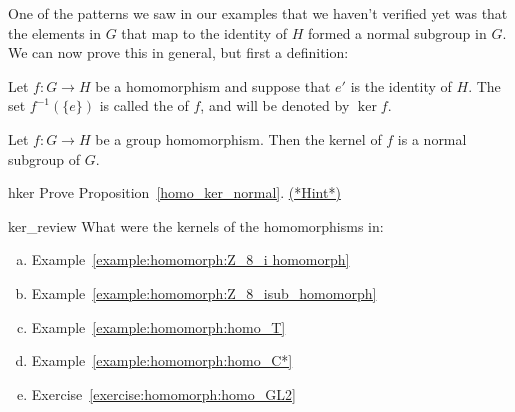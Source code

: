 \medskip

One of the patterns we saw in our examples that we haven't verified yet was that the elements in $G$ that map to the identity of $H$ formed a normal subgroup in $G$.  We can now prove this in general, but first a definition:
 
\begin{defn}\label{def:kernel} 
Let $f : G \rightarrow H$ be a  homomorphism and suppose that
$e'$ is the identity of $H$. 
The set  $f^{-1} ( \{ e \})$ is  called the  of $f$, and will
be denoted by $\ker f$\label{kernelofphi}. 
\end{defn}
 
 
\begin{thm}\label{homo_ker_normal}
Let $f : G \rightarrow H$ be a group homomorphism. Then the kernel
of $f$ is a normal subgroup of $G$. 
\end{thm}

\begin{exercise}{hker}
Prove Proposition~\ref{homo_ker_normal}. 
\hyperref[sec:homomorph:hints]{(*Hint*)} 
\end{exercise}

\begin{exercise}{ker_review}
What were the kernels of the homomorphisms in:
\begin{enumerate}[(a)]
\item
Example~\ref{example:homomorph:Z_8_i homomorph}
\item
Example~\ref{example:homomorph:Z_8_isub_homomorph}
\item
Example~\ref{example:homomorph:homo_T}
\item
Example~\ref{example:homomorph:homo_C*}
\item
Exercise~\ref{exercise:homomorph:homo_GL2}
\end{enumerate}
\end{exercise} 
 
 
